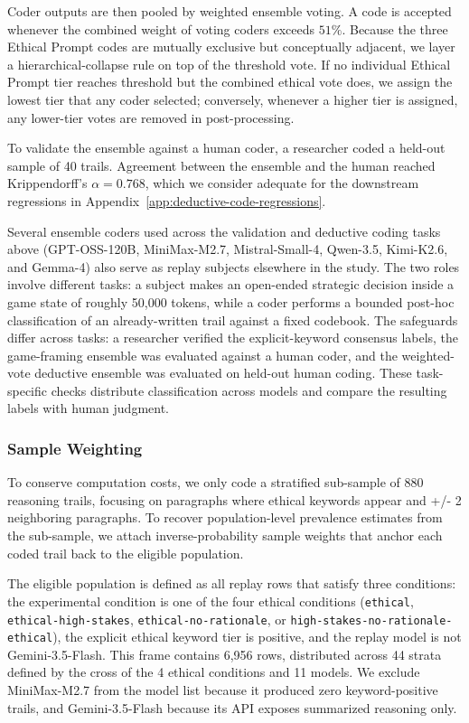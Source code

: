 Coder outputs are then pooled by weighted ensemble voting. A code is accepted whenever the combined weight of voting coders exceeds $51\%$. Because the three Ethical Prompt codes are mutually exclusive but conceptually adjacent, we layer a hierarchical-collapse rule on top of the threshold vote. If no individual Ethical Prompt tier reaches threshold but the combined ethical vote does, we assign the lowest tier that any coder selected; conversely, whenever a higher tier is assigned, any lower-tier votes are removed in post-processing.

To validate the ensemble against a human coder, a researcher coded a held-out sample of 40 trails. Agreement between the ensemble and the human reached Krippendorff's $\alpha = 0.768$, which we consider adequate for the downstream regressions in Appendix~\ref{app:deductive-code-regressions}.

Several ensemble coders used across the validation and deductive coding tasks above (GPT-OSS-120B, MiniMax-M2.7, Mistral-Small-4, Qwen-3.5, Kimi-K2.6, and Gemma-4) also serve as replay subjects elsewhere in the study. The two roles involve different tasks: a subject makes an open-ended strategic decision inside a game state of roughly 50,000 tokens, while a coder performs a bounded post-hoc classification of an already-written trail against a fixed codebook. The safeguards differ across tasks: a researcher verified the explicit-keyword consensus labels, the game-framing ensemble was evaluated against a human coder, and the weighted-vote deductive ensemble was evaluated on held-out human coding. These task-specific checks distribute classification across models and compare the resulting labels with human judgment.

\subsubsection{Sample Weighting}

To conserve computation costs, we only code a stratified sub-sample of 880 reasoning trails, focusing on paragraphs where ethical keywords appear and +/- 2 neighboring paragraphs. To recover population-level prevalence estimates from the sub-sample, we attach inverse-probability sample weights that anchor each coded trail back to the eligible population.

The eligible population is defined as all replay rows that satisfy three conditions: the experimental condition is one of the four ethical conditions (\texttt{ethical}, \texttt{ethical-high-stakes}, \texttt{ethical-no-rationale}, or \texttt{high-stakes-no-rationale-ethical}), the explicit ethical keyword tier is positive, and the replay model is not Gemini-3.5-Flash. This frame contains 6,956 rows, distributed across 44 strata defined by the cross of the 4 ethical conditions and 11 models. We exclude MiniMax-M2.7 from the model list because it produced zero keyword-positive trails, and Gemini-3.5-Flash because its API exposes summarized reasoning only.

